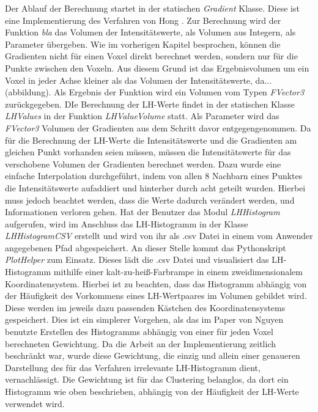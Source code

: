 Der Ablauf der Berechnung startet in der statischen \textit{Gradient} Klasse. Diese ist eine Implementierung des Verfahren von Hong \cite{hong2003method}. Zur Berechnung wird der Funktion \textit{bla} das Volumen der Intensitätswerte, als Volumen aus Integern, als Parameter übergeben. Wie im vorherigen Kapitel besprochen, können die Gradienten nicht für einen Voxel direkt berechnet werden, sondern nur für die Punkte zwischen den Voxeln. Aus diesem Grund ist das Ergebnisvolumen um ein Voxel in jeder Achse kleiner als das Volumen der Intensitätswerte, da... (abbildung). Als Ergebnis der Funktion wird ein Volumen vom Typen \textit{FVector3} zurückgegeben.
\newline
DIe Berechnung der LH-Werte findet in der statischen Klasse \textit{LHValues} in der Funktion \textit{LHValueVolume} statt. Als Parameter wird das \textit{FVector3} Volumen der Gradienten aus dem Schritt davor entgegengenommen. Da für die Berechnung der LH-Werte die Intensitätswerte und die Gradienten am gleichen Punkt vorhanden seien müssen, müssen die Intensitätswerte für das verschobene Volumen der Gradienten berechnet werden. Dazu wurde eine einfache Interpolation durchgeführt, indem von allen 8 Nachbarn eines Punktes die Intensitätswerte aufaddiert und hinterher durch acht geteilt wurden. Hierbei muss jedoch beachtet werden, dass die Werte dadurch verändert werden, und Informationen verloren gehen.
\newline
Hat der Benutzer das Modul \textit{LHHistogram} aufgerufen, wird im Anschluss das LH-Histogramm in der Klasse \textit{LHHistogramCSV} erstellt und wird von ihr als .csv Datei in einem vom Anwender angegebenen Pfad abgespeichert.
\newline
An dieser Stelle kommt das Pythonskript \textit{PlotHelper} zum Einsatz. Dieses lädt die .csv Datei und visualisiert das LH-Histogramm mithilfe einer kalt-zu-heiß-Farbrampe in einem zweidimensionalem Koordinatensystem.
\newline
Hierbei ist zu beachten, dass das Histogramm abhängig von der Häufigkeit des Vorkommens eines LH-Wertpaares im Volumen gebildet wird. Diese werden im jeweils dazu passenden Kästchen des Koordinatensystems gespeichert. Dies ist ein simplerer Vorgehen, als das im Paper von Nguyen \cite{nguyen2012clustering} benutzte Erstellen des Histogramms abhängig von einer für jeden Voxel berechneten Gewichtung. Da die Arbeit an der Implementierung zeitlich beschränkt war, wurde diese Gewichtung, die einzig und allein einer genaueren Darstellung des für das Verfahren irrelevante LH-Histogramm dient, vernachlässigt. Die Gewichtung ist für das Clustering belanglos, da dort ein Histogramm wie oben beschrieben, abhängig von der Häufigkeit der LH-Werte verwendet wird. 
